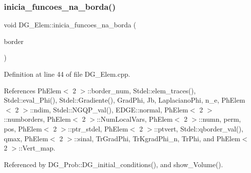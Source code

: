 \subsubsection{\texorpdfstring{inicia\+\_\+funcoes\+\_\+na\+\_\+borda()}{inicia\_funcoes\_na\_borda()}}
{\footnotesize\ttfamily void D\+G\+\_\+\+Elem\+::inicia\+\_\+funcoes\+\_\+na\+\_\+borda (\begin{DoxyParamCaption}\item[{\hyperlink{structEDGE}{E\+D\+GE} $\ast$}]{border }\end{DoxyParamCaption})}



Definition at line 44 of file D\+G\+\_\+\+Elem.\+cpp.



References Ph\+Elem$<$ 2 $>$\+::border\+\_\+num, Stdel\+::elem\+\_\+traces(), Stdel\+::eval\+\_\+\+Phi(), Stdel\+::\+Gradiente(), Grad\+Phi, Jb, Laplaciano\+Phi, n\+\_\+e, Ph\+Elem$<$ 2 $>$\+::ndim, Stdel\+::\+N\+G\+Q\+P\+\_\+val(), E\+D\+G\+E\+::normal, Ph\+Elem$<$ 2 $>$\+::numborders, Ph\+Elem$<$ 2 $>$\+::\+Num\+Local\+Vars, Ph\+Elem$<$ 2 $>$\+::numn, perm, pos, Ph\+Elem$<$ 2 $>$\+::ptr\+\_\+stdel, Ph\+Elem$<$ 2 $>$\+::ptvert, Stdel\+::qborder\+\_\+val(), qmax, Ph\+Elem$<$ 2 $>$\+::sinal, Tr\+Grad\+Phi, Tr\+Kgrad\+Phi\+\_\+n, Tr\+Phi, and Ph\+Elem$<$ 2 $>$\+::\+Vert\+\_\+map.



Referenced by D\+G\+\_\+\+Prob\+::\+D\+G\+\_\+initial\+\_\+conditions(), and show\+\_\+\+Volume().

